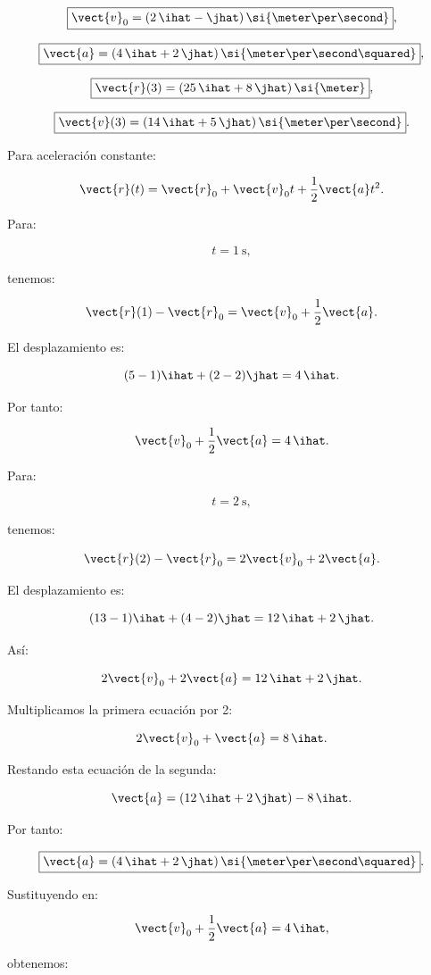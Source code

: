 \begin{respuesta}
\[
\boxed{
\vect{v}_0
=
(2\,\ihat-\jhat)\,
\si{\meter\per\second}
},
\]

\[
\boxed{
\vect{a}
=
(4\,\ihat+2\,\jhat)\,
\si{\meter\per\second\squared}
},
\]

\[
\boxed{
\vect{r}(3)
=
(25\,\ihat+8\,\jhat)\,\si{\meter}
},
\]

\[
\boxed{
\vect{v}(3)
=
(14\,\ihat+5\,\jhat)\,
\si{\meter\per\second}
}.
\]
\end{respuesta}

\begin{explicacion}
Para aceleración constante:

\[
\vect{r}(t)
=
\vect{r}_0
+
\vect{v}_0t
+
\frac{1}{2}\vect{a}t^2.
\]

Para:

\[
t=\SI{1}{\second},
\]

tenemos:

\[
\vect{r}(1)-\vect{r}_0
=
\vect{v}_0+\frac{1}{2}\vect{a}.
\]

El desplazamiento es:

\[
(5-1)\ihat+(2-2)\jhat
=
4\,\ihat.
\]

Por tanto:

\[
\vect{v}_0+\frac{1}{2}\vect{a}
=
4\,\ihat.
\]

Para:

\[
t=\SI{2}{\second},
\]

tenemos:

\[
\vect{r}(2)-\vect{r}_0
=
2\vect{v}_0+2\vect{a}.
\]

El desplazamiento es:

\[
(13-1)\ihat+(4-2)\jhat
=
12\,\ihat+2\,\jhat.
\]

Así:

\[
2\vect{v}_0+2\vect{a}
=
12\,\ihat+2\,\jhat.
\]

Multiplicamos la primera ecuación por 2:

\[
2\vect{v}_0+\vect{a}
=
8\,\ihat.
\]

Restando esta ecuación de la segunda:

\[
\vect{a}
=
(12\,\ihat+2\,\jhat)-8\,\ihat.
\]

Por tanto:

\[
\boxed{
\vect{a}
=
(4\,\ihat+2\,\jhat)\,
\si{\meter\per\second\squared}
}.
\]

Sustituyendo en:

\[
\vect{v}_0+\frac{1}{2}\vect{a}
=
4\,\ihat,
\]

obtenemos:


\end{explicacion}
